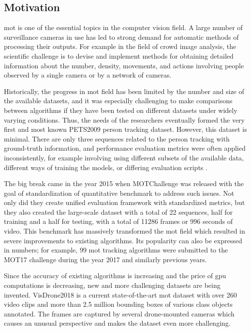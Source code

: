 \begin{introduction}
    \section{Motivation}
        \gls{mot} is one of the essential topics in the computer vision field. A large number of surveillance cameras in use has led to strong demand for automatic methods of processing their outputs. For example in the field of crowd image analysis, the scientific challenge is to devise and implement methods for obtaining detailed information about the number, density, movements, and actions involving people observed by a single camera or by a network of cameras.  
        
        Historically, the progress in \gls{mot} field has been limited by the number and size of the available datasets, and it was especially challenging to make comparisons between algorithms if they have been tested on different datasets under widely varying conditions. Thus, the needs of the researchers eventually formed the very first and most known PETS2009 \cite{ferryman2009pets2009} person tracking dataset. However, this dataset is minimal. There are only three sequences related to the person tracking with ground-truth information, and performance evaluation metrics were often applied inconsistently, for example involving using different subsets of the available data, different ways of training the models, or differing evaluation scripts \cite{MOTChallenge2015}.
        
        The big break came in the year 2015 when MOTChallenge \cite{MOTChallenge2015} was released with the goal of standardization of quantitative benchmark to address such issues. Not only did they create unified evaluation framework with standardized metrics, but they also created the large-scale dataset with a total of 22 sequences, half for training and a half for testing, with a total of 11286 frames or 996 seconds of video. This benchmark has massively transformed the \gls{mot} field which resulted in severe improvements to existing algorithms. Its popularity can also be expressed in numbers; for example, 99 \gls{mot} tracking algorithms were submitted to the MOT17 challenge \cite{mot16} during the year 2017 and similarly previous years. 
        
        Since the accuracy of existing algorithms is increasing and the price of \gls{gpu} computations is decreasing, new and more challenging datasets are being invented. VisDrone2018 \cite{zhuvisdrone2018} is a current state-of-the-art \gls{mot} dataset with over 260 video clips and more than 2.5 million bounding boxes of various class objects annotated. The frames are captured by several drone-mounted cameras which causes an unusual perspective and makes the dataset even more challenging. 
        

\end{introduction}
